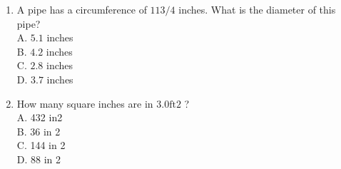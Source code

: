 \documentclass[10pt]{article}
\begin{document}
\begin{enumerate}
  \item A pipe has a circumference of $113 / 4$ inches. What is the diameter of this pipe?\\
A. $5.1$ inches\\
B. $4.2$ inches\\
C. $2.8$ inches\\
D. $3.7$ inches

  \item How many square inches are in $3.0 \mathrm{ft} 2$ ?\\
A. 432 in2\\
B. 36 in 2\\
C. 144 in 2\\
D. 88 in 2

\end{enumerate}
\end{document}
